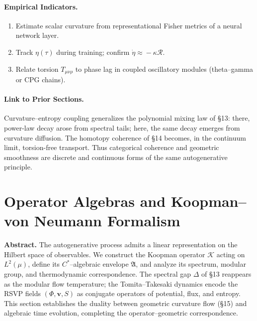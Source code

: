 \documentclass[12pt,a4paper,twoside,openright]{book}
\begin{document}
\paragraph{Empirical Indicators.}
\begin{enumerate}
\item Estimate scalar curvature from representational Fisher metrics of a neural network layer.  
\item Track $\eta(\tau)$ during training; confirm $\dot\eta\!\approx\!-\kappa\mathcal{R}$.
\item Relate torsion $T_{\mu\nu\rho}$ to phase lag in coupled oscillatory modules (theta–gamma or CPG chains).
\end{enumerate}

\paragraph{Link to Prior Sections.}
Curvature–entropy coupling generalizes the polynomial mixing law of §13:  
there, power-law decay arose from spectral tails; here, the same decay emerges from curvature diffusion.  
The homotopy coherence of §14 becomes, in the continuum limit, torsion-free transport.  
Thus categorical coherence and geometric smoothness are discrete and continuous forms of the same autogenerative principle.


\section{Operator Algebras and Koopman--von Neumann Formalism}
\label{sec:koopman}

\textbf{Abstract.}
The autogenerative process admits a linear representation on the Hilbert space of observables.  
We construct the Koopman operator $\mathcal{K}$ acting on $L^2(\mu)$, define its $C^*$--algebraic envelope $\mathfrak{A}$, and analyze its spectrum, modular group, and thermodynamic correspondence.  
The spectral gap $\Delta$ of §13 reappears as the modular flow temperature; the Tomita–Takesaki dynamics encode the RSVP fields $(\Phi,\mathbf{v},S)$ as conjugate operators of potential, flux, and entropy.  
This section establishes the duality between geometric curvature flow (§15) and algebraic time evolution, completing the operator–geometric correspondence.
\end{document}
